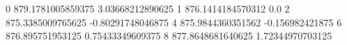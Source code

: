 0 879.1781005859375 3.03668212890625
1 876.1414184570312 0.0
2 875.3385009765625 -0.80291748046875
4 875.9844360351562 -0.156982421875
6 876.895751953125 0.75433349609375
8 877.8648681640625 1.72344970703125
